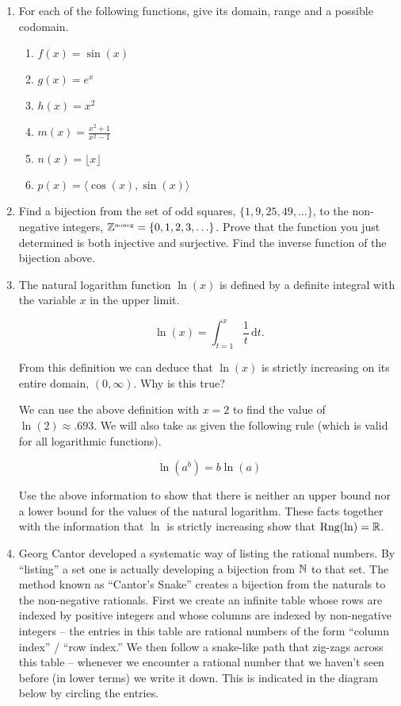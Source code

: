 
\begin{enumerate}

\item For each of the following functions, give its domain, range and a possible codomain.
  \begin{enumerate}
  \item \wbitemsep $f(x) = \sin{(x)}$
  \item \wbitemsep $g(x) = e^x$
  \item \wbitemsep $h(x) = x^2$
  \item \wbitemsep $m(x) = \frac{x^2+1}{x^2-1}$
  \item \wbitemsep $n(x) = \lfloor x \rfloor$
  \item \wbitemsep $p(x) = \langle \cos{(x)}, \sin{(x)} \rangle $
  \end{enumerate}

\item Find a bijection from the set of odd squares, $\{1, 9, 25, 49, \ldots\}$,
to the non-negative integers, ${\mathbb Z}^{\mbox{\tiny noneg}} = \{0,1,2,3, \ldots\}$.
Prove that the function you just determined is both injective and surjective.
Find the inverse function of the bijection above.

\wbvfill

\workbookpagebreak

\item The natural logarithm function $\ln (x)$ is defined by a definite
integral with the variable $x$ in the upper limit.

\[ \ln (x) = \int_{t=1}^{x} \frac{1}{t} \, \mbox{d}t. \]

From this definition we can deduce that $\ln (x)$ is strictly increasing on its
entire domain, $(0, \infty)$.  Why is this true?

We can use the above definition with $x=2$ to find the value of 
$\ln (2) \approx .693$.  We will also take as given the following 
rule (which is valid for all logarithmic functions).

\[ \ln(a^b) = b \ln(a) \]

Use the above information to show that there is neither an upper bound 
nor a lower bound for the values of the natural logarithm.  These facts
together with the information that $\ln$ is strictly increasing show that
$\mbox{Rng}(\ln) = {\mathbb R}$.
 
\wbvfill

\workbookpagebreak

\item Georg Cantor developed a systematic way of listing the rational numbers.
By ``listing'' a set one is actually developing a bijection from ${\mathbb N}$ to
that set.  The method known as ``Cantor's Snake'' creates a bijection from
the naturals to the non-negative rationals.  
First we create an infinite table whose rows
are indexed by positive integers and whose columns are indexed by non-negative
integers -- the entries in this table are rational numbers of the form
``column index'' / ``row index.''  We then follow a snake-like path that
zig-zags across this table -- whenever we encounter a rational number that 
we haven't seen before (in lower terms) we write it down.  This is indicated 
in the diagram below by circling the entries.   


\end{enumerate}

